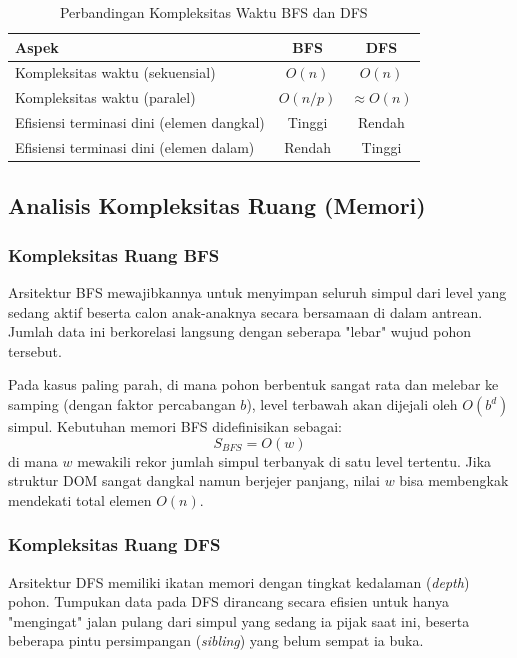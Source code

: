 \documentclass[12pt]{article}
\begin{document}
\begin{table}[H]
\centering
\begin{tabular}{|l|c|c|}
\hline
\textbf{Aspek} & \textbf{BFS} & \textbf{DFS} \\ \hline
Kompleksitas waktu (sekuensial) & $O(n)$ & $O(n)$ \\ \hline
Kompleksitas waktu (paralel) & $O(n/p)$ & $\approx O(n)$ \\ \hline
Efisiensi terminasi dini (elemen dangkal) & Tinggi & Rendah \\ \hline
Efisiensi terminasi dini (elemen dalam) & Rendah & Tinggi \\ \hline
\end{tabular}
\caption{Perbandingan Kompleksitas Waktu BFS dan DFS}
\label{tab:waktu}
\end{table}

\subsection{Analisis Kompleksitas Ruang (Memori)}

\subsubsection{Kompleksitas Ruang BFS}

Arsitektur BFS mewajibkannya untuk menyimpan seluruh simpul dari level yang sedang aktif beserta calon anak-anaknya secara bersamaan di dalam antrean. Jumlah data ini berkorelasi langsung dengan seberapa "lebar" wujud pohon tersebut.

Pada kasus paling parah, di mana pohon berbentuk sangat rata dan melebar ke samping (dengan faktor percabangan $b$), level terbawah akan dijejali oleh $O(b^d)$ simpul. Kebutuhan memori BFS didefinisikan sebagai:
\[
S_{BFS} = O(w)
\]
di mana $w$ mewakili rekor jumlah simpul terbanyak di satu level tertentu. Jika struktur DOM sangat dangkal namun berjejer panjang, nilai $w$ bisa membengkak mendekati total elemen $O(n)$.

\subsubsection{Kompleksitas Ruang DFS}

Arsitektur DFS memiliki ikatan memori dengan tingkat kedalaman (\textit{depth}) pohon. Tumpukan data pada DFS dirancang secara efisien untuk hanya "mengingat" jalan pulang dari simpul yang sedang ia pijak saat ini, beserta beberapa pintu persimpangan (\textit{sibling}) yang belum sempat ia buka.
\end{document}

